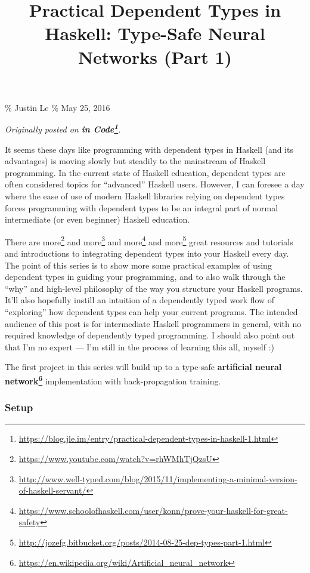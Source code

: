 \documentclass[]{article}
\title{Practical Dependent Types in Haskell: Type-Safe Neural Networks (Part 1)}
\renewcommand{\href}[2]{#2\footnote{\url{#1}}}
\begin{document}
\maketitle

\% Justin Le \% May 25, 2016

\emph{Originally posted on
\textbf{\href{https://blog.jle.im/entry/practical-dependent-types-in-haskell-1.html}{in
Code}}.}

It seems these days like programming with dependent types in Haskell (and its
advantages) is moving slowly but steadily to the mainstream of Haskell
programming. In the current state of Haskell education, dependent types are
often considered topics for ``advanced'' Haskell users. However, I can foresee a
day where the ease of use of modern Haskell libraries relying on dependent types
forces programming with dependent types to be an integral part of normal
intermediate (or even beginner) Haskell education.

There are \href{https://www.youtube.com/watch?v=rhWMhTjQzsU}{more} and
\href{http://www.well-typed.com/blog/2015/11/implementing-a-minimal-version-of-haskell-servant/}{more}
and
\href{https://www.schoolofhaskell.com/user/konn/prove-your-haskell-for-great-safety}{more}
and
\href{http://jozefg.bitbucket.org/posts/2014-08-25-dep-types-part-1.html}{more}
great resources and tutorials and introductions to integrating dependent types
into your Haskell every day. The point of this series is to show more some
practical examples of using dependent types in guiding your programming, and to
also walk through the ``why'' and high-level philosophy of the way you structure
your Haskell programs. It'll also hopefully instill an intuition of a
dependently typed work flow of ``exploring'' how dependent types can help your
current programs. The intended audience of this post is for intermediate Haskell
programmers in general, with no required knowledge of dependently typed
programming. I should also point out that I'm no expert --- I'm still in the
process of learning this all, myself :)

The first project in this series will build up to a type-safe
\textbf{\href{https://en.wikipedia.org/wiki/Artificial_neural_network}{artificial
neural network}} implementation with back-propagation training.

\subsubsection{Setup}\label{setup}
\end{document}
